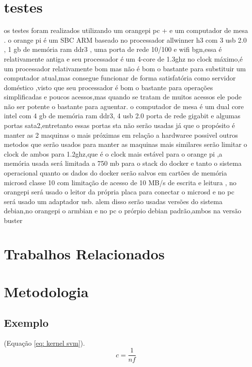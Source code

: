 \documentclass[
	12pt,				%
	openright,			%
	oneside,			%
	a4paper,			%
	english,			%
	french,				%
	spanish,			%
	brazil,				%
	]{abntex2}
\begin{document}
\chapter{testes}
\label{ch: testes}
os testes foram realizados utilizando um orangepi pc + e um computador de mesa .
o orange pi é um SBC ARM baseado no processador allwinner h3 com 3 usb 2.0 , 1 gb de memória ram ddr3 , uma porta de rede 10/100 e wifi bgn,essa é relativamente antiga e seu processador é um 4-core de 1.3ghz no clock máximo,é um processador relativamente bom mas não é bom o bastante para substituir um computador atual,mas consegue funcionar de forma satisfatória como servidor doméstico ,visto que seu processador é bom o bastante para operações simplificadas e poucos acessos,mas quando se tratam de muitos acessos ele pode não ser potente o bastante para aguentar.
o computador de mesa é um dual core intel com 4 gb de memória ram ddr3, 4 usb 2.0 porta de rede gigabit e algumas portas sata2,entretanto essas portas sta não serão usadas já que o propósito é manter as 2 maquinas o mais próximas em relação a hardwaree possivel
outros metodos que serão usados para manter as maquinas mais similares serão limitar o clock de ambos para 1.2ghz,que é o clock mais estável para o orange pi ,a memória usada será limitada a 750 mb para o stack do docker e tanto o sistema operacional quanto os dados do docker serão salvos em cartões de memória microsd classe 10 com limitação de acesso de 10 MB/s de escrita e leitura , no orangepi será usado o leitor da própria placa para conectar o microsd e no pc será usado um adaptador usb.
alem disso serão usadas versões do sistema debian,no orangepi o armbian e no pc o prórpio debian padrão,ambos na versão buster

\chapter{Trabalhos Relacionados}
\label{ch: trabalhos relacionados}

\chapter{Metodologia}
\label{ch: materiais e métodos}

\section{Exemplo}

 (Equação \ref{eq: kernel svm}).
\begin{equation}
\label{eq: kernel svm}
    c = \frac {1} {\textit{nf}}
\end{equation}
\end{document}
